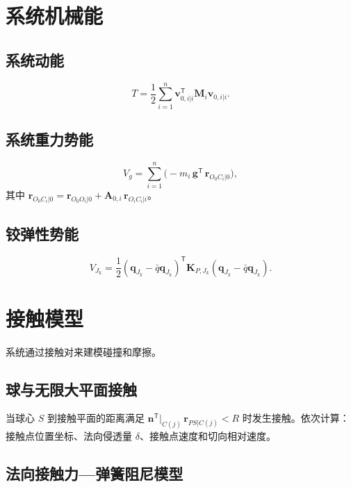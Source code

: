 \documentclass[10pt,a4paper]{book}
\theoremstyle{thmstyle}
\theoremstyle{defstyle}
\theoremstyle{prostyle}
\newcommand{\T}{^{\mathsf{T}}}
\renewcommand{\vec}[1]{\bm{#1}}
\newcommand{\mat}[1]{\bm{#1}}
\newcommand{\qbar}{\bar{q}}
\begin{document}
\section{系统机械能}

\subsection{系统动能}

\begin{equation}
T = \frac{1}{2}\sum_{i=1}^{n}\vec{v}_{0,i|i}\T\mat{M}_i\vec{v}_{0,i|i}.
\end{equation}

\subsection{系统重力势能}

\begin{equation}
V_g = \sum_{i=1}^{n} \bigl(-m_i\,\vec{g}\T\,\vec{r}_{O_0C_i|0}\bigr),
\end{equation}
其中 $\vec{r}_{O_0C_i|0} = \vec{r}_{O_0O_i|0} + \mat{A}_{0,i}\,\vec{r}_{O_iC_i|i}$。

\subsection{铰弹性势能}

\begin{equation}
V_{J_k} = \frac{1}{2}(\vec{q}_{J_k} - \qbar{\vec{q}}_{J_k})\T\mat{K}_{P,J_k}(\vec{q}_{J_k} - \qbar{\vec{q}}_{J_k}).
\label{eq:VJk}
\end{equation}

\section{接触模型}

系统通过接触对来建模碰撞和摩擦。

\subsection{球与无限大平面接触}

当球心 $S$ 到接触平面的距离满足 $\vec{n}\T|_{C(j)}\,\vec{r}_{PS|C(j)} < R$ 时发生接触。依次计算：接触点位置坐标、法向侵透量 $\delta$、接触点速度和切向相对速度。

\subsection{法向接触力---弹簧阻尼模型}
\end{document}

